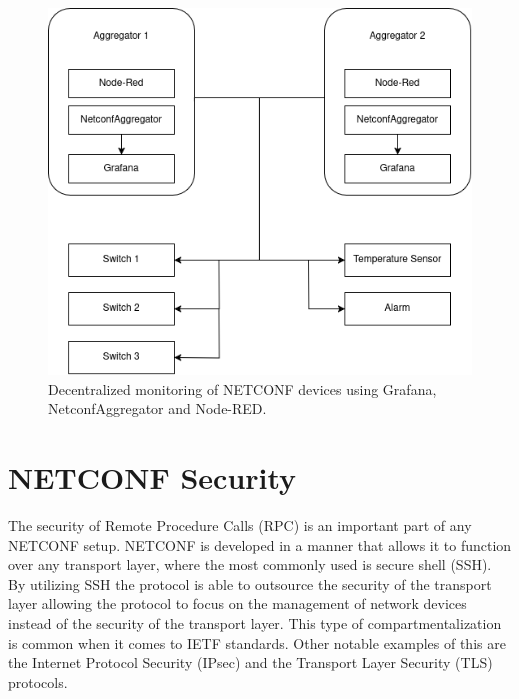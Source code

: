 \documentclass[12pt]{article}
\begin{document}
\newpage

\begin{figure}
  \centering
  \includegraphics[width=\textwidth]{architecture1.png}
  \caption{Decentralized monitoring of NETCONF devices using Grafana, NetconfAggregator and Node-RED.}
  \label{fig:decentralized-monitoring}
\end{figure}

\newpage

\section{NETCONF Security}
The security of Remote Procedure Calls (RPC) is an important part of any
NETCONF setup. NETCONF is developed in a manner that allows it to function
over any transport layer, where the most commonly used is secure shell (SSH).
By utilizing SSH the protocol is able to outsource the security of the transport layer 
allowing the protocol to focus on the management of network devices instead
of the security of the transport layer. This type of compartmentalization is common 
when it comes to IETF standards. Other notable examples of this are the Internet Protocol Security (IPsec) \cite{RFC4301} 
and the Transport Layer Security (TLS) \cite{RFC5246} protocols.
\end{document}
